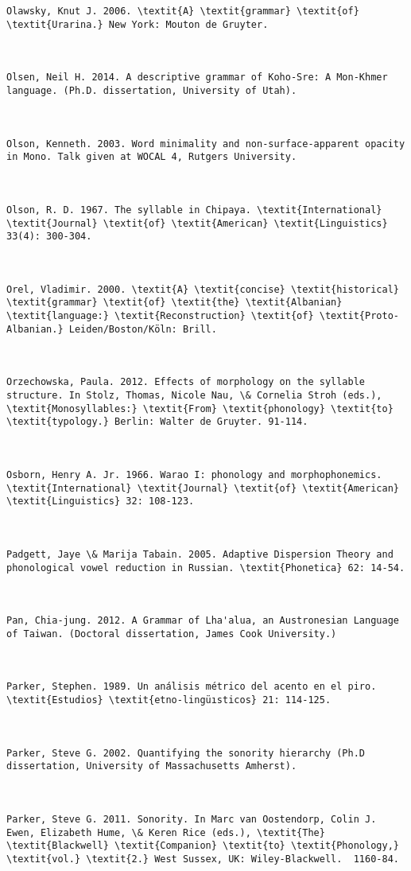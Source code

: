 \begin{verbatim}
Olawsky, Knut J. 2006. \textit{A} \textit{grammar} \textit{of} \textit{Urarina.} New York: Mouton de Gruyter.



Olsen, Neil H. 2014. A descriptive grammar of Koho-Sre: A Mon-Khmer language. (Ph.D. dissertation, University of Utah).



Olson, Kenneth. 2003. Word minimality and non-surface-apparent opacity in Mono. Talk given at WOCAL 4, Rutgers University.



Olson, R. D. 1967. The syllable in Chipaya. \textit{International} \textit{Journal} \textit{of} \textit{American} \textit{Linguistics} 33(4): 300-304.



Orel, Vladimir. 2000. \textit{A} \textit{concise} \textit{historical} \textit{grammar} \textit{of} \textit{the} \textit{Albanian} \textit{language:} \textit{Reconstruction} \textit{of} \textit{Proto-Albanian.} Leiden/Boston/Köln: Brill.



Orzechowska, Paula. 2012. Effects of morphology on the syllable structure. In Stolz, Thomas, Nicole Nau, \& Cornelia Stroh (eds.), \textit{Monosyllables:} \textit{From} \textit{phonology} \textit{to} \textit{typology.} Berlin: Walter de Gruyter. 91-114.



Osborn, Henry A. Jr. 1966. Warao I: phonology and morphophonemics. \textit{International} \textit{Journal} \textit{of} \textit{American} \textit{Linguistics} 32: 108-123.



Padgett, Jaye \& Marija Tabain. 2005. Adaptive Dispersion Theory and phonological vowel reduction in Russian. \textit{Phonetica} 62: 14-54.



Pan, Chia-jung. 2012. A Grammar of Lha'alua, an Austronesian Language of Taiwan. (Doctoral dissertation, James Cook University.)



Parker, Stephen. 1989. Un análisis métrico del acento en el piro. \textit{Estudios} \textit{etno-lingüısticos} 21: 114-125.



Parker, Steve G. 2002. Quantifying the sonority hierarchy (Ph.D dissertation, University of Massachusetts Amherst). 



Parker, Steve G. 2011. Sonority. In Marc van Oostendorp, Colin J. Ewen, Elizabeth Hume, \& Keren Rice (eds.), \textit{The} \textit{Blackwell} \textit{Companion} \textit{to} \textit{Phonology,} \textit{vol.} \textit{2.} West Sussex, UK: Wiley-Blackwell.  1160-84.




\end{verbatim}
